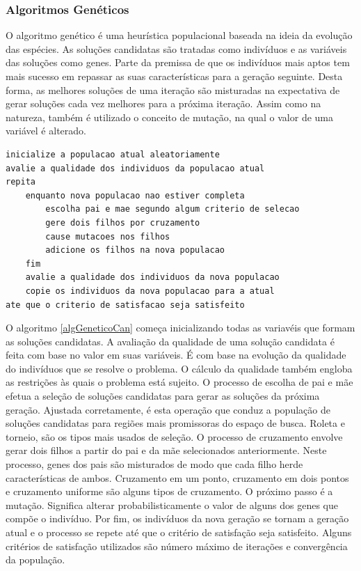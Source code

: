\documentclass[tc,twoside]{iiufrgs}
\begin{document}
\subsubsection{Algoritmos Genéticos}

O algoritmo genético é uma heurística populacional baseada na ideia da evolução das espécies. As soluções candidatas são tratadas como indivíduos e as variáveis das soluções como genes. Parte da premissa de que os indivíduos mais aptos tem mais sucesso em repassar as suas características para a geração seguinte. Desta forma, as melhores soluções de uma iteração são misturadas na expectativa de gerar soluções cada vez melhores para a próxima iteração. Assim como na natureza, também é utilizado o conceito de mutação, na qual o valor de uma variável é alterado. \cite{luke2009metaheuristics} \cite{mitchell1998introduction} %

\begin{lstlisting}[caption=Algoritmo genético canônico, label=algGeneticoCan]
inicialize a populacao atual aleatoriamente
avalie a qualidade dos individuos da populacao atual
repita
	enquanto nova populacao nao estiver completa
		escolha pai e mae segundo algum criterio de selecao
		gere dois filhos por cruzamento
		cause mutacoes nos filhos
		adicione os filhos na nova populacao
	fim
	avalie a qualidade dos individuos da nova populacao
	copie os individuos da nova populacao para a atual
ate que o criterio de satisfacao seja satisfeito
\end{lstlisting}

O algoritmo \ref{algGeneticoCan} começa inicializando todas as variavéis que formam as soluções candidatas. A avaliação da qualidade de uma solução candidata é feita com base no valor em suas variáveis. É com base na evolução da qualidade do indivíduos que se resolve o problema. O cálculo da qualidade também engloba as restrições às quais o problema está sujeito. O processo de escolha de pai e mãe efetua a seleção de soluções candidatas para gerar as soluções da próxima geração. Ajustada corretamente, é esta operação que conduz a população de soluções candidatas para regiões mais promissoras do espaço de busca. Roleta e torneio, são os tipos mais usados de seleção. O processo de cruzamento envolve gerar dois filhos a partir do pai e da mãe selecionados anteriormente. Neste processo, genes dos pais são misturados de modo que cada filho herde características de ambos. Cruzamento em um ponto, cruzamento em dois pontos e cruzamento uniforme são alguns tipos de cruzamento. O próximo passo é a mutação. Significa alterar probabilisticamente o valor de alguns dos genes que compõe o indivíduo. Por fim, os indivíduos da nova geração se tornam a geração atual e o processo se repete até que o critério de satisfação seja satisfeito. Alguns critérios de satisfação utilizados são número máximo de iterações e convergência da população. \cite{luke2009metaheuristics} \cite{mitchell1998introduction} %
\end{document}
